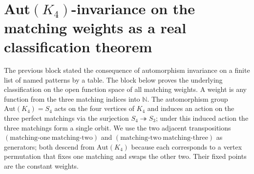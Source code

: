 \documentclass[11pt]{article}
\begin{document}
\begin{code}
\>[34]\AgdaSymbol{=}\AgdaSpace{}%
\<%
\\
%
\>[2]\AgdaSymbol{;}\AgdaSpace{}%
%
\>[34]\AgdaSymbol{=}\AgdaSpace{}%
\<%
\\
%
\>[2]\AgdaSymbol{;}\AgdaSpace{}%
%
\>[34]\AgdaSymbol{=}\AgdaSpace{}%
\<%
\\
%
\>[2]\AgdaSymbol{;}\AgdaSpace{}%
%
\>[34]\AgdaSymbol{=}\AgdaSpace{}%
\<%
\\
%
\>[2]\AgdaSymbol{;}\AgdaSpace{}%
\AgdaSpace{}%
\AgdaSymbol{=}\AgdaSpace{}%
\<%
\\
%
\>[2]\AgdaSymbol{;}\AgdaSpace{}%
\AgdaSpace{}%
\AgdaSymbol{=}\AgdaSpace{}%
\<%
\\
%
\>[2]\AgdaSymbol{\}}\<%
\end{code}

\section{Aut\texorpdfstring{$(K_4)$}{(K4)}-invariance on the matching
weights as a real classification theorem}

The previous block stated the consequence of automorphism invariance
on a finite list of named patterns by a table.  The block below proves
the underlying classification on the open function space of all
matching weights.  A weight is any function from the three matching
indices into $\mathbb{N}$.  The automorphism group $\mathrm{Aut}(K_4)
= S_4$ acts on the four vertices of $K_4$ and induces an action on the
three perfect matchings via the surjection $S_4 \twoheadrightarrow
S_3$; under this induced action the three matchings form a single
orbit.  We use the two adjacent transpositions
$(\text{matching-one}\ \text{matching-two})$ and
$(\text{matching-two}\ \text{matching-three})$ as generators; both
descend from $\mathrm{Aut}(K_4)$ because each corresponds to a vertex
permutation that fixes one matching and swaps the other two.  Their
fixed points are the constant weights.
\end{document}
